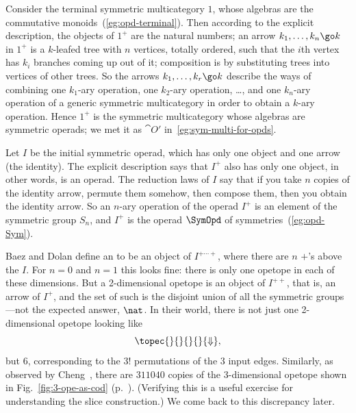 \begin{example}
  Consider the terminal%
%
%
symmetric multicategory $1$, whose algebras are the
  commutative monoids~(\ref{eg:opd-terminal}).  Then according to the
  explicit description, the objects of $1^+$ are the natural numbers; an
  arrow $k_1, \ldots, k_n \go k$ in $1^+$ is a $k$-leafed tree with $n$
  vertices, totally ordered, such that the $i$th vertex has $k_i$ branches
  coming up out of it; composition is by substituting trees into vertices
  of other trees.  So the arrows $k_1, \ldots, k_r \go k$ describe the ways
  of combining one $k_1$-ary operation, one $k_2$-ary operation, \ldots,
  and one $k_n$-ary operation of a generic symmetric multicategory in order
  to obtain a $k$-ary operation.  Hence $1^+$ is the symmetric
  multicategory%
%
%
whose algebras are symmetric operads; we met it as
  $\cat{O}'$ in~\ref{eg:sym-multi-for-opds}.
\end{example}

\begin{example}
  Let $I$%
% 
% 
be the initial%
%
%
symmetric operad, which has only one object and one arrow
(the identity).  The explicit description says that $I^+$ also has only one
object, in other words, is an operad.  The reduction laws of $I$ say that
if you take $n$ copies of the identity arrow, permute them somehow, then
compose them, then you obtain the identity arrow.  So an $n$-ary operation
of the operad $I^+$ is an element of the symmetric group $S_n$, and $I^+$
is the operad%
%
%
$\SymOpd$ of symmetries~(\ref{eg:opd-Sym}).
\end{example}

Baez and Dolan define an %
%
%
to be an object of
$I^{+\cdots +}$, where there are $n$ $+$'s above the $I$.  For $n=0$ and
$n=1$ this looks fine: there is only one opetope in each of these
dimensions.  But a 2-dimensional opetope is an object of $I^{++}$, that is,
an arrow of $I^+$, and the set of such is the disjoint union of all the
symmetric groups---not%
%
%
the expected answer, $\nat$.  In their world, there is not just
one 2-dimensional opetope looking like
\[
\topec{}{}{}{}{\Downarrow},
\]
but 6,%
%
%
corresponding to the $3!$ permutations of the 3 input edges.
Similarly, as observed by Cheng~\cite[1.3]{CheWOM},%
%
%
there are $311040$
copies of the 3-dimensional opetope shown in Fig.~\ref{fig:3-ope-as-cod}
(p.~\pageref{fig:3-ope-as-cod}).  (Verifying this is a useful exercise for
understanding the slice construction.)  We come back to this discrepancy
later.

